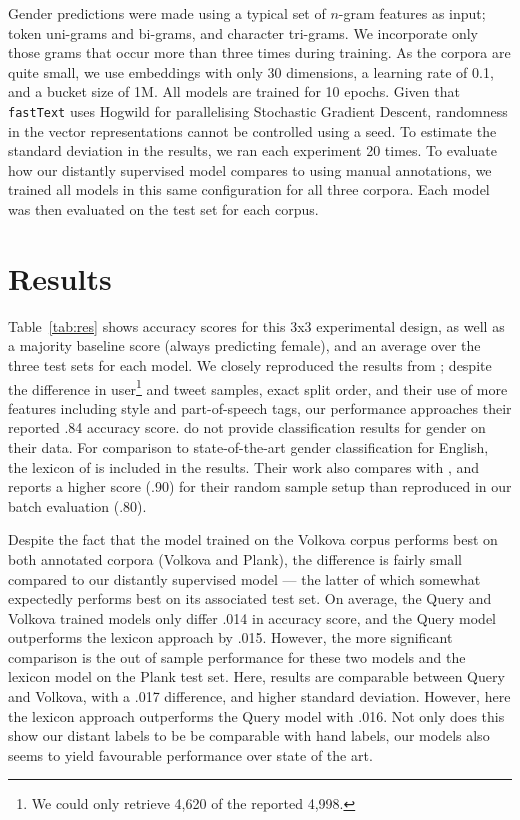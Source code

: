 \documentclass[11pt,letterpaper]{article}
\begin{document}
Gender predictions were made using a typical set of
$n$-gram features as input; token uni-grams and bi-grams, and character
tri-grams. We incorporate only those grams that occur more than three
times during training. As the corpora are quite small, we use embeddings with
only 30 dimensions, a learning rate of 0.1, and a
bucket size of 1M. All models are trained for 10 epochs. Given that
{\tt fastText} uses Hogwild \cite{recht2011} for parallelising Stochastic
Gradient Descent, randomness in the vector representations cannot be controlled
using a seed. To estimate the standard deviation in the results, we ran each
experiment 20 times. To evaluate how our distantly supervised model compares
to using manual annotations, we trained all models in this same configuration
for all three corpora. Each model was then evaluated on the test set for each
corpus.

\section{Results}

Table~\ref{tab:res} shows accuracy scores for this 3x3 experimental design, as
well as a majority baseline score (always predicting female), and an average
over the three test sets for each model. We closely reproduced the results
from ; despite the difference in user\footnote{We
could only retrieve 4,620 of the reported 4,998.} and tweet samples, exact
split order, and their use of more features including style and part-of-speech
tags, our performance approaches their reported .84 accuracy score.
 do not provide classification results for gender on their
data. For comparison to state-of-the-art gender classification for English, the
lexicon of  is included in the results. Their work also
compares with , and reports a higher
score (.90) for their random sample setup than reproduced in our batch
evaluation (.80).

Despite the fact that the model trained on the Volkova corpus performs best on
both annotated corpora (Volkova and Plank), the
difference is fairly small compared to our distantly supervised model --- the
latter of which somewhat expectedly performs best on its associated test set.
On average, the Query and Volkova trained models only differ .014 in accuracy
score, and the Query model outperforms the lexicon approach by .015. However,
the more significant comparison is the out of sample performance for these two
models and the lexicon model on the Plank test set. Here, results are comparable
between Query and Volkova, with a .017 difference, and higher standard deviation.
However, here the lexicon approach outperforms the Query model with .016. Not only
does this show our distant labels to be be comparable with hand labels, our
models also seems to yield favourable performance over state of the art.
\end{document}
